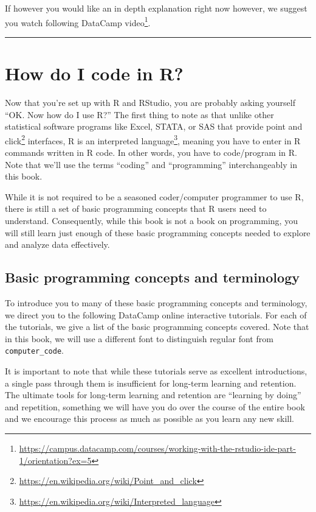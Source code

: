 \documentclass[12pt, krantz2,]{krantz}
\renewcommand{\href}[2]{#2\footnote{\url{#1}}}
\begin{document}
If however you would like an in depth explanation right now however, we suggest you watch following \href{https://campus.datacamp.com/courses/working-with-the-rstudio-ide-part-1/orientation?ex=5}{DataCamp video}.

\begin{center}\rule{0.5\linewidth}{\linethickness}\end{center}

\hypertarget{code}{%
\section{How do I code in R?}\label{code}}

Now that you're set up with R and RStudio, you are probably asking yourself ``OK. Now how do I use R?'' The first thing to note as that unlike other statistical software programs like Excel, STATA, or SAS that provide \href{https://en.wikipedia.org/wiki/Point_and_click}{point and click} interfaces, R is an \href{https://en.wikipedia.org/wiki/Interpreted_language}{interpreted language}, meaning you have to enter in R commands written in R code. In other words, you have to code/program in R. Note that we'll use the terms ``coding'' and ``programming'' interchangeably in this book.

While it is not required to be a seasoned coder/computer programmer to use R, there is still a set of basic programming concepts that R users need to understand. Consequently, while this book is not a book on programming, you will still learn just enough of these basic programming concepts needed to explore and analyze data effectively.

\hypertarget{programming-concepts}{%
\subsection{Basic programming concepts and terminology}\label{programming-concepts}}

To introduce you to many of these basic programming concepts and terminology, we direct you to the following DataCamp online interactive tutorials. For each of the tutorials, we give a list of the basic programming concepts covered. Note that in this book, we will use a different font to distinguish regular font from \texttt{computer\_code}.

It is important to note that while these tutorials serve as excellent introductions, a single pass through them is insufficient for long-term learning and retention. The ultimate tools for long-term learning and retention are ``learning by doing'' and repetition, something we will have you do over the course of the entire book and we encourage this process as much as possible as you learn any new skill.
\end{document}

